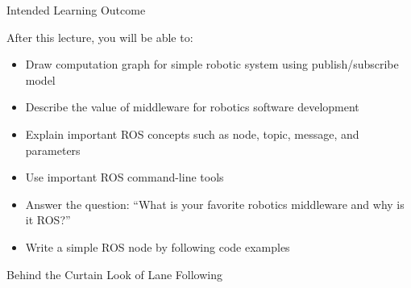 \documentclass[aspectratio=43]{beamer}
\begin{document}
\begin{frame}{Intended Learning Outcome}
	\begin{block}{After this lecture, you will be able to:}
	\begin{itemize}[<+->]
		\item Draw computation graph for simple robotic system using publish/subscribe model
		\item Describe the value of middleware for robotics software development
		\item Explain important ROS concepts such as node, topic, message, and parameters
		\item Use important ROS command-line tools
		\item Answer the question: ``What is your favorite robotics middleware and why is it ROS?''
		\item Write a simple ROS node by following code examples
	\end{itemize}
	\end{block}
\end{frame}

\begin{frame}{Behind the Curtain Look of Lane Following}
	\begin{center}
	\end{center}
\end{frame}
\end{document}
